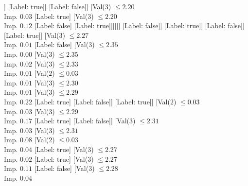 \documentclass[margin=10pt]{standalone}
\begin{document}
\begin{forest}
																			[Val($3$) $ \leq 2.19$ \\ Imp. $0.14$
																				[Val($3$) $ \leq 2.18$ \\ Imp. $0.03$
																					[Val($3$) $ \leq 2.18$ \\ Imp. $0.38$
																						[Label: true]
																						[Label: false]]
																					[Label: true]]
																				[Label: false]]
																			[Val($3$) $ \leq 2.20$ \\ Imp. $0.03$
																				[Label: true]
																				[Val($3$) $ \leq 2.20$ \\ Imp. $0.12$
																					[Label: false]
																					[Label: true]]]]]]
																[Label: false]]
															[Label: true]]
														[Label: false]]
													[Label: true]]
												[Val($3$) $ \leq 2.27$ \\ Imp. $0.01$
													[Label: false]
													[Val($3$) $ \leq 2.35$ \\ Imp. $0.00$
														[Val($3$) $ \leq 2.35$ \\ Imp. $0.02$
															[Val($3$) $ \leq 2.33$ \\ Imp. $0.01$
																[Val($2$) $ \leq 0.03$ \\ Imp. $0.01$
																	[Val($3$) $ \leq 2.30$ \\ Imp. $0.01$
																		[Val($3$) $ \leq 2.29$ \\ Imp. $0.22$
																			[Label: true]
																			[Label: false]]
																		[Label: true]]
																	[Val($2$) $ \leq 0.03$ \\ Imp. $0.03$
																		[Val($3$) $ \leq 2.29$ \\ Imp. $0.17$
																			[Label: true]
																			[Label: false]]
																		[Val($3$) $ \leq 2.31$ \\ Imp. $0.03$
																			[Val($3$) $ \leq 2.31$ \\ Imp. $0.08$
																				[Val($2$) $ \leq 0.03$ \\ Imp. $0.04$
																					[Label: true]
																					[Val($3$) $ \leq 2.27$ \\ Imp. $0.02$
																						[Label: true]
																						[Val($3$) $ \leq 2.27$ \\ Imp. $0.11$
																							[Label: false]
																							[Val($3$) $ \leq 2.28$ \\ Imp. $0.04$

\end{forest}
\end{document}
